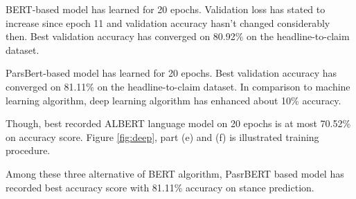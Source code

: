 BERT-based model has learned for 20 epochs. Validation loss has stated to increase since epoch 11 and validation accuracy hasn't changed considerably then. Best validation accuracy has converged on 80.92\% on the headline-to-claim dataset. 

ParsBert-based model has learned for 20 epochs. Best validation accuracy has converged on 81.11\% on the headline-to-claim dataset. In comparison to machine learning algorithm, deep learning algorithm has enhanced about 10\% accuracy.

Though, best recorded ALBERT language model on 20 epochs is at most 70.52\% on accuracy score. Figure \ref{fig:deep}, part (e) and (f) is illustrated training procedure.

Among these three alternative of BERT algorithm, PasrBERT based model has recorded best accuracy score with 81.11\% accuracy on stance prediction.  
